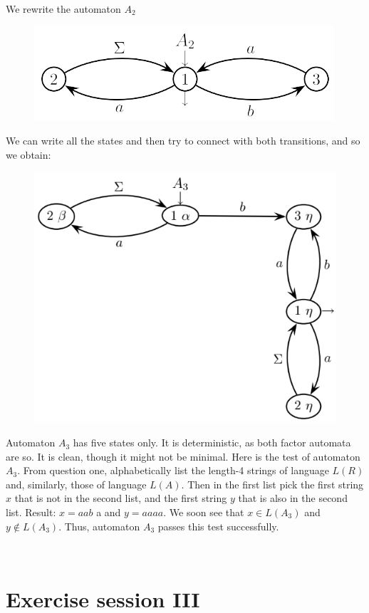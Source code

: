 \documentclass[12pt, a4paper]{report}
\begin{document}
\begin{enumerate}
\begin{figure}[H]
                \end{figure}
                We rewrite the automaton $A_2$
                \begin{figure}[H]
                    \centering
                    \includegraphics[width=0.5\linewidth]{images/FSA6a.png}
                \end{figure}
                We can write all the states and then try to connect with both transitions, and so we obtain: 
                \begin{figure}[H]
                    \centering
                    \includegraphics[width=0.5\linewidth]{images/FSA7a.png}
                \end{figure}
                Automaton $A_3$ has five states only. It is deterministic, as both factor automata are so. It is clean, though it might not be minimal. Here is the test of automaton $A_3$. From question one, 
                alphabetically list the length-4 strings of language $L(R)$ and, similarly, those of language $L(A)$. Then in the first list pick the first string $x$ that is not in the second list, and the first 
                string $y$ that is also in the second list. Result: $x=a a b$ a and $y=a a a a$. We soon see that $x \in L(A_3)$ and $y \notin L(A_3)$. Thus, automaton $A_3$ passes this test successfully.
        \end{enumerate}

\newpage

\

\newpage

\chapter{Exercise session III}
\end{document}
